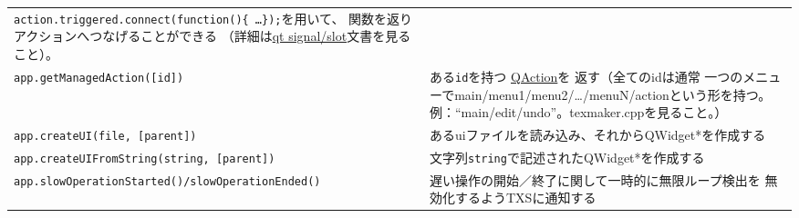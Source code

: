 \begin{table}[H]
\begin{tabularx}{\linewidth}{lX}
      \texttt{action.triggered.connect(function()\{ \ldots{}\});}を用いて、
      関数を返りアクションへつなげることができる
      （詳細は\href{http://developer.qt.nokia.com/doc/qt-4.8/scripting.html\#signal-to-function-connections}{qt signal/slot}文書を見ること）。\\
    \texttt{app.getManagedAction({[}id{]})}
      & ある\texttt{id}を持つ
      \href{http://developer.qt.nokia.com/doc/qt-4.8/QAction.html}{QAction}を
      返す（全てのidは通常
      一つのメニューでmain/menu1/menu2/\ldots{}/menuN/actionという形を持つ。
      例：``main/edit/undo''。texmaker.cppを見ること。）\\
    \texttt{app.createUI(file, {[}parent{]})}
      & あるuiファイルを読み込み、それからQWidget*を作成する\\
    \texttt{app.createUIFromString(string, {[}parent{]})}
      & 文字列\texttt{string}で記述されたQWidget*を作成する\\
    \texttt{app.slowOperationStarted()/slowOperationEnded()}
      & 遅い操作の開始／終了に関して一時的に無限ループ検出を
      無効化するようTXSに通知する\\
    \hline
  \end{tabularx}
\end{table}


